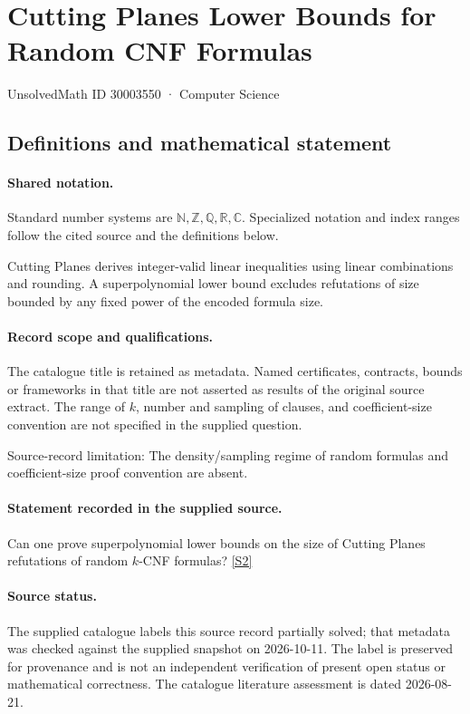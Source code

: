\documentclass[11pt]{article}
\newcommand{\sref}[2]{\hyperlink{source:#1:#2}{[S#2]}}
\begin{document}
\setcounter{section}{30003549}
\section{Cutting Planes Lower Bounds for Random CNF Formulas}\label{30003550}
{\small\sffamily UnsolvedMath ID 30003550 · Computer Science}
\subsection{Definitions and mathematical statement}

\paragraph{Shared notation.}Standard number systems are $\mathbb N,\mathbb Z,\mathbb Q,\mathbb R,\mathbb C$. Specialized notation and index ranges follow the cited source and the definitions below.


Cutting Planes derives integer-valid linear inequalities using linear combinations and rounding. A superpolynomial lower bound excludes refutations of size bounded by any fixed power of the encoded formula size.
\paragraph{Record scope and qualifications.}
The catalogue title is retained as metadata. Named certificates, contracts, bounds or frameworks in that title are not asserted as results of the original source extract.
The range of $k$, number and sampling of clauses, and coefficient-size convention are not specified in the supplied question.

Source-record limitation: The density/sampling regime of random formulas and coefficient-size proof convention are absent.
\paragraph{Statement recorded in the supplied source.}
Can one prove superpolynomial lower bounds on the size of Cutting Planes refutations of random $k$-CNF formulas? \sref{30003550}{2}
\paragraph{Source status.}
The supplied catalogue labels this source record partially solved; that metadata was checked against the supplied snapshot on 2026-10-11. The label is preserved for provenance and is not an independent verification of present open status or mathematical correctness. The catalogue literature assessment is dated 2026-08-21.
\end{document}
